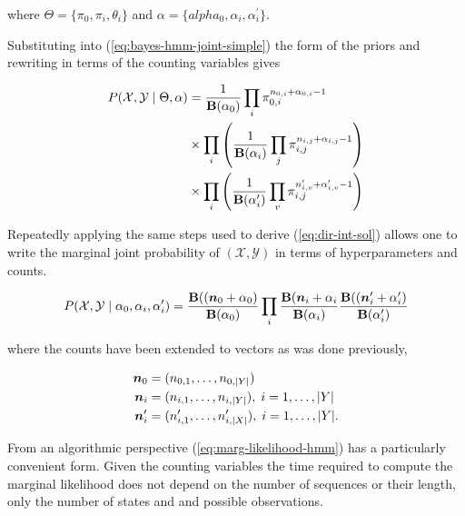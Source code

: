 \documentclass[12pt]{report}
\newcommand{\p}[0]{\prime}
\newcommand{\1}[0]{\mathbbm{1}}
\newcommand{\Bf}[0]{\text{\textbf{B}}}
\DeclarePairedDelimiter\abs{\lvert}{\rvert}%
\begin{document}
where $\Theta = \{\pi_0, \pi_i, \theta_i\}$ and $\alpha = \{alpha_0, \alpha_i, \alpha_i^\prime\}$.

Substituting into (\ref{eq:bayes-hmm-joint-simple}) the form of the priors and 
rewriting in terms of the counting variables gives

\begin{align} \label{eq:bayes-hmm-joint-full}
    P(\mathcal{X}, \mathcal{Y} \mid \Theta, \alpha)
    &= \frac{1}{\Bf(\alpha_0)} \prod_{i} \pi_{0,i}^{n_{0,i} + \alpha_{0,i} - 1} \nonumber \\
    & \times \prod_i \left(\frac{1}{\Bf(\alpha_i)} \prod_{j} \pi_{i,j}^{n_{i,j} + \alpha_{i,j} - 1}\right) \nonumber \\
    & \times \prod_i \left(\frac{1}{\Bf(\alpha_i^\prime)} \prod_{v} \pi_{i,j}^{n_{i,v}^\prime + \alpha_{i,v}^\prime - 1}\right)
\end{align}

Repeatedly applying the same steps used to derive (\ref{eq:dir-int-sol})
allows one to write the marginal joint probability of $(\mathcal{X}, \mathcal{Y})$
in terms of hyperparameters and counts.

\begin{equation}
    P(\mathcal{X}, \mathcal{Y} \mid \alpha_0, \alpha_i, \alpha_i^\prime)
    = \frac{\Bf((\bm{n}_0 + \alpha_0)}{\Bf(\alpha_0)}
    \prod_i \frac{\Bf{(\bm{n}_i + \alpha_i}}{\Bf(\alpha_i)} 
    \frac{\Bf((\bm{n}_i^\p + \alpha_i^\p)}{\Bf(\alpha_i^\p)} 
    \label{eq:marg-likelihood-hmm}
\end{equation}

where the counts have been extended to vectors as was done previously,

\begin{align*}
    \bm{n}_0 &= (n_{0,1}, \ldots, n_{0,\abs{Y}}) \\
    \bm{n}_i &= (n_{i,1}, \ldots, n_{i,\abs{Y}}),\; i = 1, \ldots, \abs{Y} \\
    \bm{n}_i^\p &= (n_{i,1}^\p, \ldots, n_{i,\abs{X}}^\p),\; i = 1, \ldots, \abs{Y}. \\
\end{align*}

From an algorithmic perspective (\ref{eq:marg-likelihood-hmm}) has a particularly convenient
form. Given the counting variables the time required to compute the marginal likelihood does not 
depend on the number of sequences or their length, only the number of states and and possible observations.
\end{document}
